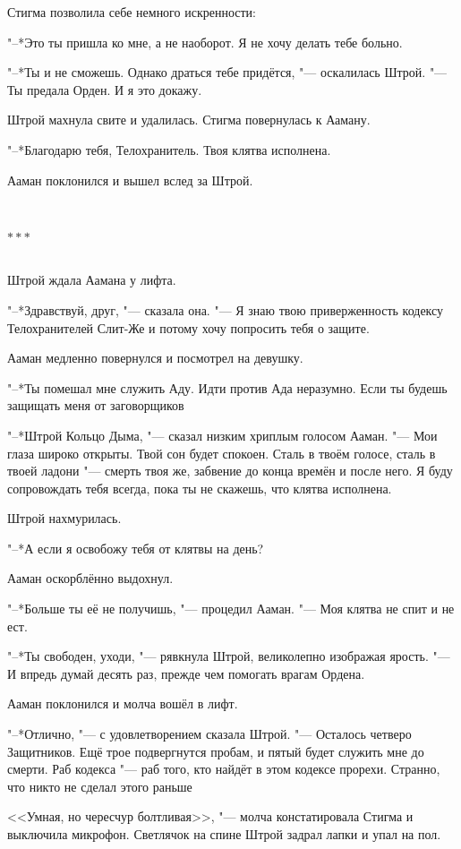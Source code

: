 \documentclass[a4paper,10pt,fleqn]{book}
\newcommand{\ldotst}{\so{...}\xspace}
\newcommand{\razd}{~\\{\centering\Large\bfseries$\ast \ast \ast$\par}~\\}
\begin{document}
Стигма позволила себе немного искренности:

"--*Это ты пришла ко мне, а не наоборот.
Я не хочу делать тебе больно.

"--*Ты и не сможешь.
Однако драться тебе придётся, "--- оскалилась Штрой.
"--- Ты предала Орден.
И я это докажу.

Штрой махнула свите и удалилась.
Стигма повернулась к Ааману.

"--*Благодарю тебя, Телохранитель.
Твоя клятва исполнена.

Ааман поклонился и вышел вслед за Штрой.

\razd

Штрой ждала Аамана у лифта.

"--*Здравствуй, друг, "--- сказала она.
"--- Я знаю твою приверженность кодексу Телохранителей Слит-Же и потому хочу попросить тебя о защите.

Ааман медленно повернулся и посмотрел на девушку.

"--*Ты помешал мне служить Аду.
Идти против Ада неразумно.
Если ты будешь защищать меня от заговорщиков\ldotst

"--*Штрой Кольцо Дыма, "--- сказал низким хриплым голосом Ааман.
"--- Мои глаза широко открыты.
Твой сон будет спокоен.
Сталь в твоём голосе, сталь в твоей ладони "--- смерть твоя же, забвение до конца времён и после него.
Я буду сопровождать тебя всегда, пока ты не скажешь, что клятва исполнена.

Штрой нахмурилась.

"--*А если я освобожу тебя от клятвы на день?

Ааман оскорблённо выдохнул.

"--*Больше ты её не получишь, "--- процедил Ааман.
"--- Моя клятва не спит и не ест.

"--*Ты свободен, уходи, "--- рявкнула Штрой, великолепно изображая ярость.
"--- И впредь думай десять раз, прежде чем помогать врагам Ордена.

Ааман поклонился и молча вошёл в лифт.

"--*Отлично, "--- с удовлетворением сказала Штрой.
"--- Осталось четверо Защитников.
Ещё трое подвергнутся пробам, и пятый будет служить мне до смерти.
Раб кодекса "--- раб того, кто найдёт в этом кодексе прорехи.
Странно, что никто не сделал этого раньше\ldotst

<<Умная, но чересчур болтливая>>, "--- молча констатировала Стигма и выключила микрофон.
Светлячок на спине Штрой задрал лапки и упал на пол.
\end{document}
